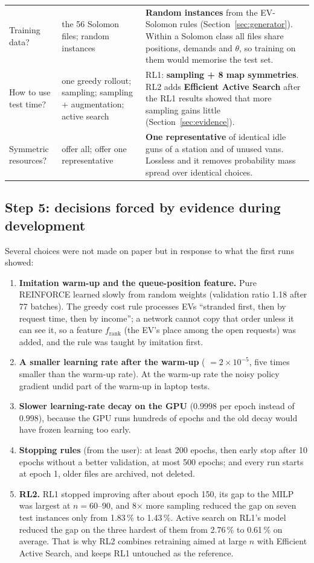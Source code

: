 {\begin{longtable}{@{}>{\raggedright\arraybackslash}p{3.4cm}>{\raggedright\arraybackslash}p{4.4cm}>{\raggedright\arraybackslash}p{7.5cm}@{}}
Training data? & the 56 Solomon files; random instances & \textbf{Random instances} from the EV-Solomon rules (Section~\ref{sec:generator}). Within a Solomon class all files share positions, demands and $\theta$, so training on them would memorise the test set. \\
How to use test time? & one greedy rollout; sampling; sampling + augmentation; active search & RL1: \textbf{sampling + 8 map symmetries}. RL2 adds \textbf{Efficient Active Search} after the RL1 results showed that more sampling gains little (Section~\ref{sec:evidence}). \\
Symmetric resources? & offer all; offer one representative & \textbf{One representative} of identical idle guns of a station and of unused vans. Lossless and it removes probability mass spread over identical choices. \\
\bottomrule
\end{longtable}}

\subsection{Step 5: decisions forced by evidence during development}

Several choices were not made on paper but in response to what the first runs showed:
\begin{enumerate}
  \item \textbf{Imitation warm-up and the queue-position feature.} Pure REINFORCE learned slowly from random weights (validation ratio 1.18 after 77 batches). The greedy cost rule processes EVs ``stranded first, then by request time, then by income''; a network cannot copy that order unless it can see it, so a feature $f_{\text{rank}}$ (the EV's place among the open requests) was added, and the rule was taught by imitation first.
  \item \textbf{A smaller learning rate after the warm-up} ( $=2\times10^{-5}$, five times smaller than the warm-up rate). At the warm-up rate the noisy policy gradient undid part of the warm-up in laptop tests.
  \item \textbf{Slower learning-rate decay on the GPU} ($0.9998$ per epoch instead of $0.998$), because the GPU runs hundreds of epochs and the old decay would have frozen learning too early.
  \item \textbf{Stopping rules} (from the user): at least 200 epochs, then early stop after 10 epochs without a better validation, at most 500 epochs; and every run starts at epoch 1, older files are archived, not deleted.
  \item \textbf{RL2.} RL1 stopped improving after about epoch 150, its gap to the MILP was largest at $n=60$--$90$, and 8$\times$ more sampling reduced the gap on seven test instances only from 1.83\,\% to 1.43\,\%. Active search on RL1's model reduced the gap on the three hardest of them from 2.76\,\% to 0.61\,\% on average. That is why RL2 combines retraining aimed at large $n$ with Efficient Active Search, and keeps RL1 untouched as the reference.
\end{enumerate}

